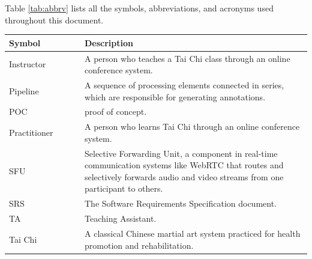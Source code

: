 \documentclass[12pt, titlepage]{article}
\begin{document}
Table \ref{tab:abbrv} lists all the symbols, abbreviations, and acronyms used
throughout this document.
\renewcommand{\arraystretch}{1.2}
\begin{table}[H]
  \centering
  \begin{tabular}{L{0.25\linewidth}L{0.8\linewidth}} \toprule
    \textbf{Symbol}                  & \textbf{Description}                                                                                                                                                                    \\ \midrule
    Instructor                 & A person who teaches a Tai Chi class through an online conference system.                                                                                                          \\
    Pipeline                   & A sequence of processing elements connected in series, which are responsible for generating annotations.                                                                           \\
    POC                        & proof of concept.                                                                                                                                                                  \\
    Practitioner               & A person who learns Tai Chi through an online conference system.                                                                                                                   \\
    SFU                        & Selective Forwarding Unit, a component in real-time communication systems like WebRTC that routes and selectively forwards audio and video streams from one participant to others. \\
    SRS                        & The Software Requirements Specification document.                                                                                                                                  \\
    TA                         & Teaching Assistant.                                                                                                                                                                \\
    Tai Chi                    & A classical Chinese martial art system practiced for health promotion and rehabilitation.                                                                                          \\

\end{tabular}
\end{table}
\end{document}
